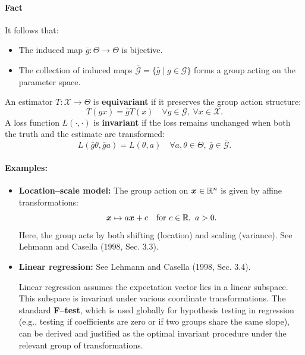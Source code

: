\paragraph{Fact}
It follows that:
\begin{itemize}
    \item The induced map \(\bar{g}: \Theta \to \Theta\) is bijective.
    \item The collection of induced maps \(\bar{\mathcal{G}} = \{\bar{g} \mid g \in \mathcal{G}\}\) forms a group acting on the parameter space.
\end{itemize}

\begin{definition}
    \label{def:equivariant_estimator}
An estimator \(T: \mathcal{X} \to \Theta\) is \textbf{equivariant} if it preserves the group action structure:
\[
T(gx) = \bar{g}T(x) \quad \forall g \in \mathcal{G}, \ \forall x \in \mathcal{X}.
\]
A loss function \(L(\cdot, \cdot)\) is \textbf{invariant} if the loss remains unchanged when both the truth and the estimate are transformed:
\[
L(\bar{g}\theta, \bar{g}a) = L(\theta, a) \quad \forall a, \theta \in \Theta, \ \bar{g} \in \bar{\mathcal{G}}.
\]
\end{definition}

\paragraph{Examples:}

\begin{itemize}
    \item \textbf{Location--scale model:} The group action on \(\boldsymbol{x} \in \mathbb{R}^n\) is given by affine transformations:
    \[
    \boldsymbol{x} \mapsto a\boldsymbol{x} + c \quad \text{for } c \in \mathbb{R}, \ a > 0.
    \]
    Here, the group acts by both shifting (location) and scaling (variance). See Lehmann and Casella (1998, Sec. 3.3).

    \item \textbf{Linear regression:} See Lehmann and Casella (1998, Sec. 3.4).
    
    
   \begin{note}[]
       
    Linear regression assumes the expectation vector lies in a linear subspace. This subspace is invariant under various coordinate transformations. The standard \textbf{F--test}, which is used globally for hypothesis testing in regression (e.g., testing if coefficients are zero or if two groups share the same slope), can be derived and justified as the optimal invariant procedure under the relevant group of transformations.
   \end{note} 
\end{itemize}

